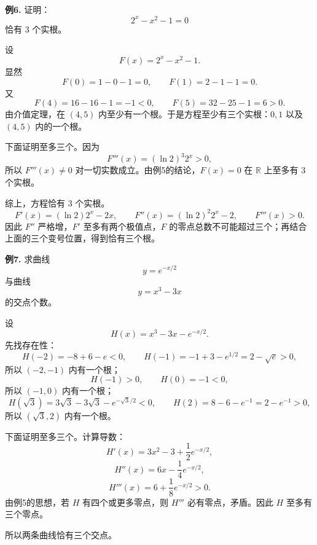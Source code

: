 \begin{problemblock}
\textbf{例6.} 证明：
\[
2^x-x^2-1=0
\]
恰有 \(3\) 个实根。
\end{problemblock}
\begin{solutionblock}
设
\[
F(x)=2^x-x^2-1.
\]
显然
\[
F(0)=1-0-1=0,\qquad F(1)=2-1-1=0.
\]
又
\[
F(4)=16-16-1=-1<0,\qquad F(5)=32-25-1=6>0.
\]
由介值定理，在 \((4,5)\) 内至少有一个根。于是方程至少有三个实根：\(0,1\) 以及 \((4,5)\) 内的一个根。

下面证明至多三个。因为
\[
F'''(x)=(\ln2)^3 2^x>0,
\]
所以 \(F'''(x)\ne0\) 对一切实数成立。由例5的结论，\(F(x)=0\) 在 \(\mathbb R\) 上至多有 \(3\) 个实根。

综上，方程恰有 \(3\) 个实根。
\[
F'(x)=(\ln2)2^x-2x,\qquad
F''(x)=(\ln2)^2 2^x-2,\qquad
F'''(x)>0.
\]
因此 \(F''\) 严格增，\(F'\) 至多有两个极值点，\(F\) 的零点总数不可能超过三个；再结合上面的三个变号位置，得到恰有三个根。
\end{solutionblock}

\begin{problemblock}
\textbf{例7.} 求曲线
\[
y=e^{-x/2}
\]
与曲线
\[
y=x^3-3x
\]
的交点个数。
\end{problemblock}
\begin{solutionblock}
设
\[
H(x)=x^3-3x-e^{-x/2}.
\]
先找存在性：
\[
H(-2)=-8+6-e<0,\qquad
H(-1)=-1+3-e^{1/2}=2-\sqrt e>0,
\]
所以 \((-2,-1)\) 内有一个根；
\[
H(-1)>0,\qquad H(0)=-1<0,
\]
所以 \((-1,0)\) 内有一个根；
\[
H(\sqrt3)=3\sqrt3-3\sqrt3-e^{-\sqrt3/2}<0,\qquad
H(2)=8-6-e^{-1}=2-e^{-1}>0,
\]
所以 \((\sqrt3,2)\) 内有一个根。

下面证明至多三个。计算导数：
\[
H'(x)=3x^2-3+\frac12e^{-x/2},
\]
\[
H''(x)=6x-\frac14e^{-x/2},
\]
\[
H'''(x)=6+\frac18e^{-x/2}>0.
\]
由例5的思想，若 \(H\) 有四个或更多零点，则 \(H'''\) 必有零点，矛盾。因此 \(H\) 至多有三个零点。

所以两条曲线恰有三个交点。
\end{solutionblock}

